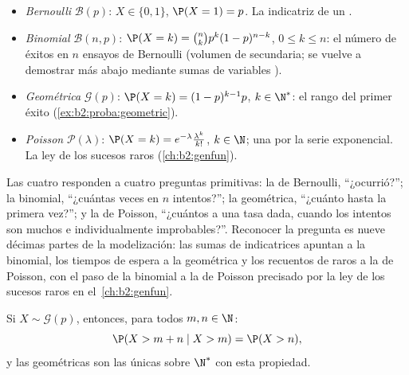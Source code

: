\begin{example}\label{ex:b2:randomvar:laws}
\leavevmode
\begin{itemize}
\item \emph{Bernoulli} $\mathcal{B}(p)$: $X \in \{0, 1\}$, $\P(X =
1) = p$. La indicatriz de un .
\item \emph{Binomial} $\mathcal{B}(n, p)$: $\P(X = k) = \binom nk
p^k(1-p)^{n-k}$, $0 \leq k \leq n$: el número de éxitos en $n$
ensayos de Bernoulli  (volumen de secundaria; se
vuelve a demostrar más abajo mediante sumas de variables
).
\item \emph{Geométrica} $\mathcal{G}(p)$: $\P(X = k) =
(1-p)^{k-1}p$, $k \in \N^*$: el rango del primer éxito
(\cref{ex:b2:proba:geometric}).
\item \emph{Poisson} $\mathcal{P}(\lambda)$: $\P(X = k) =
e^{-\lambda}\frac{\lambda^k}{k!}$, $k \in \N$; una
 por la serie exponencial. La ley de los
sucesos raros (\cref{ch:b2:genfun}).
\end{itemize}
\end{example}

\begin{remark}
Las cuatro  responden a cuatro preguntas primitivas: la de
Bernoulli, ``¿ocurrió?''; la binomial, ``¿cuántas veces en $n$
intentos?''; la geométrica, ``¿cuánto hasta la primera vez?''; y la
de Poisson, ``¿cuántos  a una tasa dada, cuando los intentos
son muchos e individualmente improbables?''. Reconocer la pregunta es
nueve décimas partes de la modelización: las sumas de indicatrices
apuntan a la binomial, los tiempos de espera a la geométrica y los
recuentos de  raros a la de Poisson, con el paso de la
binomial a la de Poisson precisado por la ley de los sucesos raros en
el~\cref{ch:b2:genfun}.
\end{remark}

\begin{proposition}\label{prop:b2:randomvar:memoryless}
Si $X \sim \mathcal{G}(p)$, entonces, para todos $m, n \in \N$:
\[
\P(X > m + n \mid X > m) = \P(X > n) ,
\]
y las  geométricas son las únicas  sobre $\N^*$ con esta
propiedad.
\end{proposition}


